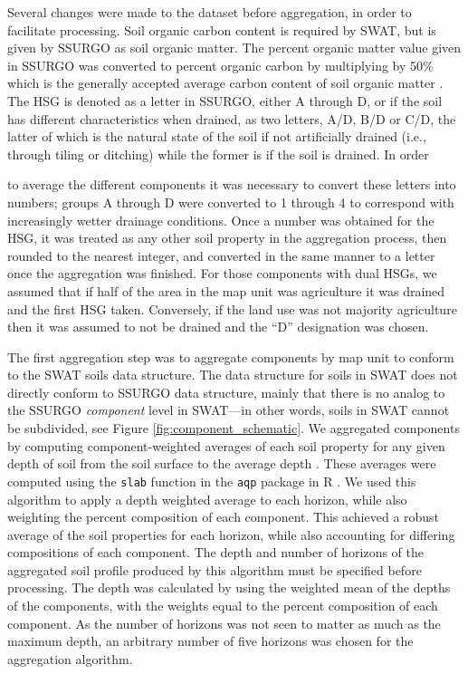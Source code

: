 Several changes were made to the dataset before aggregation, in order to
facilitate processing. Soil organic carbon content is required by SWAT, but is
given by SSURGO as soil organic matter. The percent organic matter  value given in SSURGO
was converted to percent organic carbon by multiplying by 50\% which is the generally accepted average carbon content of soil organic matter \citep{brady_elements_2004}. The HSG is
denoted as a letter in SSURGO, either A through D, or if the soil has different
characteristics when drained, as two letters, A/D, B/D or C/D, the latter of
which is the natural state of the soil if not artificially drained (i.e.,
through tiling or ditching) while the former is if the soil is drained. In order

to average the different components it was necessary to convert these letters
into numbers; groups A through D were converted to 1 through 4 to correspond
with increasingly wetter drainage conditions. Once a number was obtained for the
HSG, it was treated as any other soil property in the aggregation process,
then rounded to the nearest integer, and converted in the same manner to a letter
once the aggregation was finished. For those components with dual HSGs, we
assumed that if half of the area in the map unit was agriculture it was drained
and the first HSG taken. Conversely, if the land use was not majority agriculture
then it was assumed to not be drained and the ``D'' designation was chosen.

The first aggregation step was to aggregate components by map unit to conform to
the SWAT soils data structure. The data structure for soils in SWAT does not
directly conform to SSURGO data structure, mainly that there is no analog to the
SSURGO \textit{component} level in SWAT---in other words, soils in SWAT cannot
be subdivided, see Figure \ref{fig:component_schematic}. We aggregated components by computing
component-weighted averages of each soil property for any given depth of soil from the soil surface to the average depth \cite{gatzke_aggregation_2011, beaudette_algorithms_2013}.
These averages were computed using the \texttt{slab} function in the \texttt{aqp} package in R \cite{beaudette_algorithms_2013}. We
used this algorithm to apply a depth weighted average to each horizon, while
also weighting the percent composition of each component. This achieved a robust
average of the soil properties for each horizon, while also accounting for
differing compositions of each component. The depth and number of horizons of
the aggregated soil profile produced by this algorithm must be specified before
processing. The depth was calculated by using the weighted mean of the depths of
the components, with the weights equal to the percent composition of each
component. As the number of horizons was not seen to matter as much as the
maximum depth, an arbitrary number of five horizons was chosen for the
aggregation algorithm.

